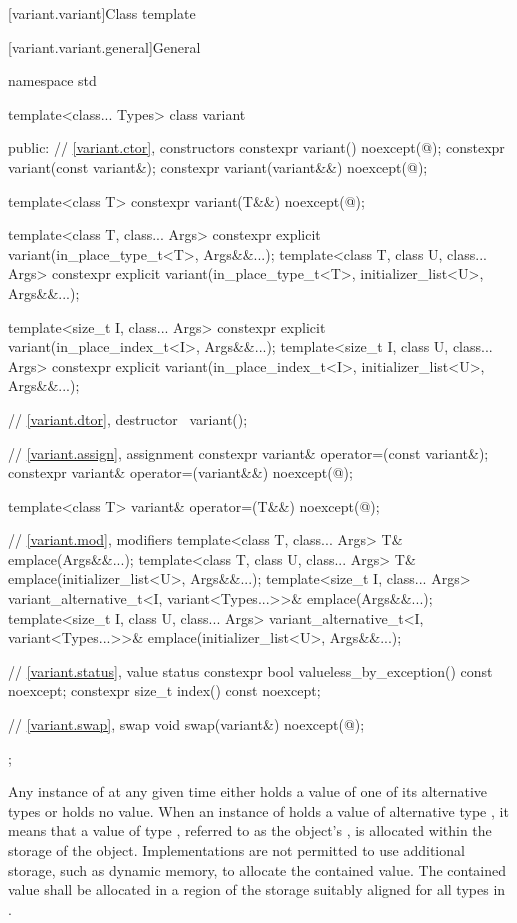 [variant.variant]{Class template }%
%

[variant.variant.general]{General}

\begin{codeblock}
namespace std {
  template<class... Types>
  class variant {
  public:
    // \ref{variant.ctor}, constructors
    constexpr variant() noexcept(@\seebelow@);
    constexpr variant(const variant&);
    constexpr variant(variant&&) noexcept(@\seebelow@);

    template<class T>
      constexpr variant(T&&) noexcept(@\seebelow@);

    template<class T, class... Args>
      constexpr explicit variant(in_place_type_t<T>, Args&&...);
    template<class T, class U, class... Args>
      constexpr explicit variant(in_place_type_t<T>, initializer_list<U>, Args&&...);

    template<size_t I, class... Args>
      constexpr explicit variant(in_place_index_t<I>, Args&&...);
    template<size_t I, class U, class... Args>
      constexpr explicit variant(in_place_index_t<I>, initializer_list<U>, Args&&...);

    // \ref{variant.dtor}, destructor
    ~variant();

    // \ref{variant.assign}, assignment
    constexpr variant& operator=(const variant&);
    constexpr variant& operator=(variant&&) noexcept(@\seebelow@);

    template<class T> variant& operator=(T&&) noexcept(@\seebelow@);

    // \ref{variant.mod}, modifiers
    template<class T, class... Args>
      T& emplace(Args&&...);
    template<class T, class U, class... Args>
      T& emplace(initializer_list<U>, Args&&...);
    template<size_t I, class... Args>
      variant_alternative_t<I, variant<Types...>>& emplace(Args&&...);
    template<size_t I, class U, class... Args>
      variant_alternative_t<I, variant<Types...>>& emplace(initializer_list<U>, Args&&...);

    // \ref{variant.status}, value status
    constexpr bool valueless_by_exception() const noexcept;
    constexpr size_t index() const noexcept;

    // \ref{variant.swap}, swap
    void swap(variant&) noexcept(@\seebelow@);
  };
}
\end{codeblock}

\pnum
Any instance of  at any given time either holds a value
of one of its alternative types or holds no value.
When an instance of  holds a value of alternative type ,
it means that a value of type , referred to as the 
object's , is allocated within the storage of the
 object.
Implementations are not permitted to use additional storage, such as dynamic
memory, to allocate the contained value.
The contained value shall be allocated in a region of the 
storage suitably aligned for all types in .

